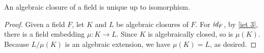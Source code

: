 \begin{cor}
    An algebraic closure of a field is unique up to isomorphism.
\end{cor}
\begin{proof}
    Given a field $F$, let $K$ and $L$ be algebraic closures of $F$.
    For $\textit{id}_{F}$, by \cref{iet 3}, there is a field embedding $\mu: K\rightarrow L$.
    Since $K$ is algebraically closed, so is $\mu(K)$.
    Because $L/\mu(K)$ is an algebraic extension, we have $\mu(K)=L$, as desired.
\end{proof}